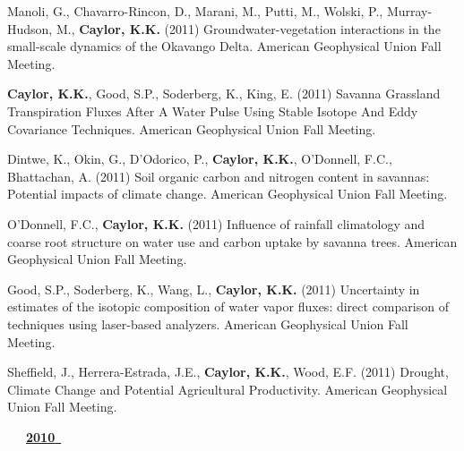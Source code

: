 \begin{etaremune}
\item Manoli, G., Chavarro-Rincon, D., Marani, M., Putti, M., Wolski, P., Murray-Hudson, M., \textbf{ Caylor, K.K.} (2011) Groundwater-vegetation interactions in the small-scale dynamics of the Okavango Delta. American Geophysical Union Fall Meeting.
\item \textbf{ Caylor, K.K.}, Good, S.P., Soderberg, K., King, E. (2011) Savanna Grassland Transpiration Fluxes After A Water Pulse Using Stable Isotope And Eddy Covariance Techniques. American Geophysical Union Fall Meeting.
\item Dintwe, K., Okin, G., D'Odorico, P., \textbf{ Caylor, K.K.}, O'Donnell, F.C., Bhattachan, A. (2011) Soil organic carbon and nitrogen content in savannas: Potential impacts of climate change. American Geophysical Union Fall Meeting.
\item O'Donnell, F.C., \textbf{ Caylor, K.K.} (2011) Influence of rainfall climatology and coarse root structure on water use and carbon uptake by savanna trees. American Geophysical Union Fall Meeting.
\item Good, S.P., Soderberg, K., Wang, L., \textbf{ Caylor, K.K.} (2011) Uncertainty in estimates of the isotopic composition of water vapor fluxes: direct comparison of techniques using laser-based analyzers. American Geophysical Union Fall Meeting.
\item Sheffield, J., Herrera-Estrada, J.E., \textbf{ Caylor, K.K.}, Wood, E.F. (2011) Drought, Climate Change and Potential Agricultural Productivity. American Geophysical Union Fall Meeting.

\vspace{0.1in}
\mbox{\ \ \ \underline{\textbf{2010 }}}
\vspace{0.1in}


\end{etaremune}
